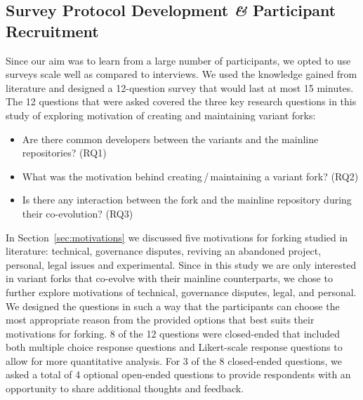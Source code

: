 \subsection{Survey Protocol Development \textit{\&} Participant Recruitment}
\label{sec:protocal}
Since our aim was to learn from a large number of participants, we opted to use surveys scale well as compared to interviews.
We used the knowledge gained from literature and designed a 12-question survey that would last at most 15 minutes. The 12 questions that were asked covered the three key research questions in this study of exploring motivation of creating and maintaining variant forks:

\begin{itemize}
\item Are there common developers between the variants and the mainline repositories? (RQ1)
\item What was the motivation behind creating\,/\,maintaining a variant fork? (RQ2)
\item Is there any interaction between the fork and the mainline repository during their co-evolution? (RQ3)
\end{itemize}

In Section~\ref{sec:motivations} we discussed five motivations for forking studied in literature: technical, governance disputes, reviving an abandoned project, personal, legal issues and experimental. 
Since in this study we are only interested in variant forks that co-evolve with their mainline counterparts, we chose to further explore motivations of technical, governance disputes, legal, and personal. We designed the questions in such a way that the participants can choose the most appropriate reason from the provided options that best suits their motivations for forking. 8 of the 12 questions were closed-ended that included both multiple choice response questions and Likert-scale response questions to allow for more quantitative analysis. For 3 of the 8 closed-ended questions, we asked a total of 4 optional open-ended questions to provide respondents with an opportunity to share additional thoughts and feedback.

